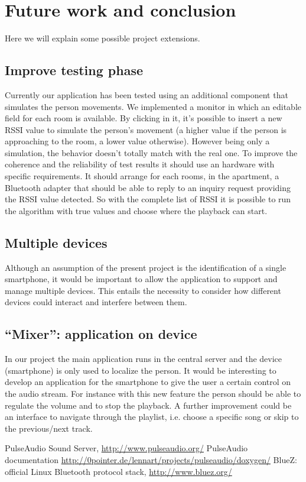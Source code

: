 \documentclass[conference]{IEEEtran}
\begin{document}
\section{Future work and conclusion}
Here we will explain some possible project extensions.

\subsection{Improve testing phase}
Currently our application has been tested using an additional component that simulates the person movements. We implemented a monitor in which an editable field for each room is available. By clicking in it, it's possible to insert a new RSSI value to simulate the person's movement (a higher value if the person is approaching to the room, a lower value otherwise).%
However being only a simulation, the behavior doesn't totally match  with the real one. To improve the coherence and the reliability of test results it should use an hardware with specific requirements. It should arrange for each rooms, in the apartment, a Bluetooth adapter that should be able to reply to an inquiry request providing the RSSI value detected. So with the complete list of RSSI it is possible to run the algorithm with true values and choose where the playback can start.

\subsection{Multiple devices}
Although an assumption of the present project is the identification of a single smartphone, it would be important to allow the application to support and manage multiple devices. This entails the necessity to consider how different devices could interact and interfere between them.

\subsection{``Mixer'': application on device}
In our project the main application runs in the central server and the device (smartphone) is only used to localize the person. It would be interesting to develop an application for the smartphone to give the user a certain control on the audio stream. For instance with this new feature the person should be able to regulate the volume and to stop the playback. A further improvement could be an interface to navigate through the playlist, i.e. choose a specific song or skip to the previous/next track.


\begin{thebibliography}{1}
		PulseAudio Sound Server,
		\url{http://www.pulseaudio.org/}
		PulseAudio documentation
		\url{http://0pointer.de/lennart/projects/pulseaudio/doxygen/}
		BlueZ: official Linux Bluetooth protocol stack,
		\url{http://www.bluez.org/}

\end{thebibliography}
\end{document}

